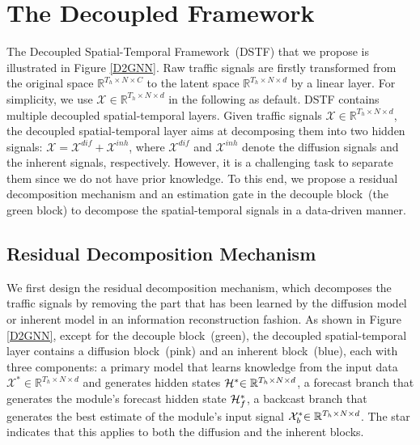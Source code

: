 \documentclass[sigconf, nonacm]{acmart}
\def\bb#1{\mathbb{#1}}
\def\cal#1{\mathcal{#1}}
\begin{document}
\section{The Decoupled Framework}
\label{Section4}
The Decoupled Spatial-Temporal Framework~{\color{black}(DSTF)} that we propose is illustrated in Figure \ref{D2GNN}.
{\color{black}
Raw traffic signals are firstly transformed from the original space $\mathbb{R}^{T_h\times N\times C}$ to the latent space $\mathbb{R}^{T_h\times N\times d}$ by a linear layer.
For simplicity, we use $\mathcal{X}\in\mathbb{R}^{T_h\times N\times d}$ in the following as default.}
{\color{black} DSTF contains multiple decoupled spatial-temporal layers.
Given traffic signals $\mathcal{X}\in\mathbb{R}^{T_h\times N \times d}$,
the decoupled spatial-temporal layer aims at decomposing them into two hidden signals: $\mathcal{X}=\mathcal{X}^{dif}+\mathcal{X}^{inh}$, 
where $\mathcal{X}^{dif}$ and $\mathcal{X}^{inh}$ denote the diffusion signals and the inherent signals, respectively. 
However, it is a challenging task to separate them since we do not have prior knowledge.
}
{\color{black}To this end}, we propose a residual decomposition mechanism and an {\color{black}estimation} gate {\color{black}in the decouple block~(the green block) to decompose the spatial-temporal signals in a data-driven manner}.

\subsection{Residual Decomposition Mechanism}
\label{sec_res}
We first design the residual decomposition mechanism{\color{black}, which} decomposes the traffic signals {\color{black} by removing the part that has been learned by the diffusion model or inherent model in an information reconstruction fashion.}
As shown in Figure \ref{D2GNN}, {\color{black}except for the decouple block~(green), the decoupled spatial-temporal layer contains} a {\color{black}diffusion block~(pink)} and an {\color{black}inherent block~(blue)}, each with three components:
a primary model that learns knowledge from the input data {\color{black}$\mathcal{X}^*\in\bb{R}^{T_h\times N\times d}$} and generates hidden states ${\color{black}\cal{H}^*}{\color{black}\in\mathbb{R}^{T_h\times N\times d}}$, a forecast branch that generates the module's forecast hidden state ${\color{black} \cal{H}_f^*}$, a backcast branch that generates the best estimate of the module's input signal ${\color{black}\cal{X}_b^*}{\color{black}\in\mathbb{R}^{T_h\times N\times d}}$. The star indicates that this applies to both the {\color{black}diffusion and the inherent blocks}.
\end{document}

